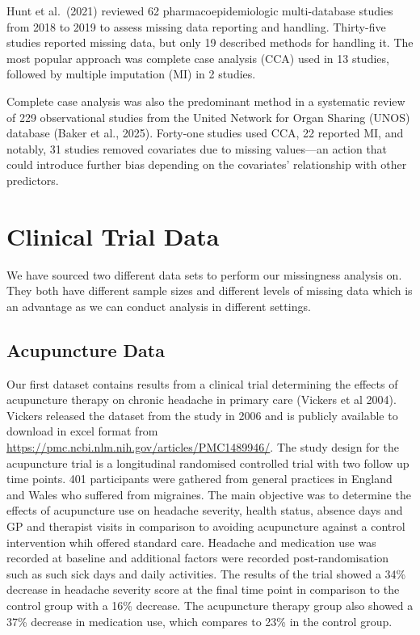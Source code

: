 \documentclass{article}
\begin{document}
Hunt et al.~(2021) reviewed 62 pharmacoepidemiologic multi-database
studies from 2018 to 2019 to assess missing data reporting and handling.
Thirty-five studies reported missing data, but only 19 described methods
for handling it. The most popular approach was complete case analysis
(CCA) used in 13 studies, followed by multiple imputation (MI) in 2
studies.

Complete case analysis was also the predominant method in a systematic
review of 229 observational studies from the United Network for Organ
Sharing (UNOS) database (Baker et al., 2025). Forty-one studies used
CCA, 22 reported MI, and notably, 31 studies removed covariates due to
missing values---an action that could introduce further bias depending
on the covariates' relationship with other predictors.

\newpage

\section{Clinical Trial Data}\label{clinical-trial-data}

We have sourced two different data sets to perform our missingness
analysis on. They both have different sample sizes and different levels
of missing data which is an advantage as we can conduct analysis in
different settings.

\subsection{Acupuncture Data}\label{acupuncture-data}

Our first dataset contains results from a clinical trial determining the
effects of acupuncture therapy on chronic headache in primary care
(Vickers et al 2004). Vickers released the dataset from the study in
2006 and is publicly available to download in excel format from
\url{https://pmc.ncbi.nlm.nih.gov/articles/PMC1489946/}. The study
design for the acupuncture trial is a longitudinal randomised controlled
trial with two follow up time points. 401 participants were gathered
from general practices in England and Wales who suffered from migraines.
The main objective was to determine the effects of acupuncture use on
headache severity, health status, absence days and GP and therapist
visits in comparison to avoiding acupuncture against a control
intervention whih offered standard care. Headache and medication use was
recorded at baseline and additional factors were recorded
post-randomisation such as such sick days and daily activities. The
results of the trial showed a 34\% decrease in headache severity score
at the final time point in comparison to the control group with a 16\%
decrease. The acupuncture therapy group also showed a 37\% decrease in
medication use, which compares to 23\% in the control group.
\end{document}
